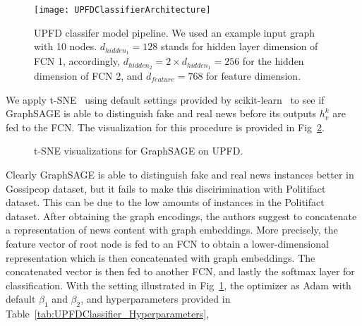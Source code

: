 \begin{figure}
    \centering
    \texttt{[image: UPFDClassifierArchitecture]}
    \caption[UPFD classifier model pipeline]{UPFD classifer model pipeline. We used an example input graph with 10 nodes. $d_{hidden_1} = 128$ stands for hidden layer dimension of FCN 1, accordingly, $d_{hidden_2} = 2 \times d_{hidden_1} = 256$ for the hidden dimension of FCN 2, and $d_{feature} = 768$ for feature dimension.}
    \label{fig:UPFDClassifierArchitecture}
\end{figure}
We apply t-SNE~\parencite{tSNE_vanDerMaaten} using default settings provided by scikit-learn~\parencite{ScikitLearn_Pedregosa} to see if GraphSAGE is able to distinguish fake and real news before its outputs $h_v^k$ are fed to the FCN. The visualization for this procedure is provided in Fig~\ref{fig:TSNE_GraphSAGE}.
\begin{figure}
    \centering
    \hfill
    \caption[t-SNE visualizations for GraphSAGE]{t-SNE visualizations for GraphSAGE on UPFD.}
    \label{fig:TSNE_GraphSAGE}
\end{figure}
Clearly GraphSAGE is able to distinguish fake and real news instances better in Gossipcop dataset, but it fails to make this discirimination with Politifact dataset. This can be due to the low amounts of instances in the Politifact dataset. After obtaining the graph encodings, the authors suggest to concatenate a representation of news content with graph embeddings. More precisely, the feature vector of root node is fed to an FCN to obtain a lower-dimensional representation which is then concatenated with graph embeddings. The concatenated vector is then fed to another FCN, and lastly the softmax layer for classification. With the setting illustrated in Fig~\ref{fig:UPFDClassifierArchitecture}, the optimizer as Adam with default $\beta_1$ and $\beta_2$, and hyperparameters provided in Table~\ref{tab:UPFDClassifier_Hyperparameters},
